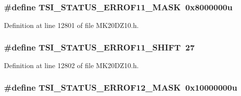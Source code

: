 \subsubsection[{\texorpdfstring{T\+S\+I\+\_\+\+S\+T\+A\+T\+U\+S\+\_\+\+E\+R\+R\+O\+F11\+\_\+\+M\+A\+SK}{TSI_STATUS_ERROF11_MASK}}]{\setlength{\rightskip}{0pt plus 5cm}\#define T\+S\+I\+\_\+\+S\+T\+A\+T\+U\+S\+\_\+\+E\+R\+R\+O\+F11\+\_\+\+M\+A\+SK~0x8000000u}\hypertarget{group___t_s_i___register___masks_ga572c3e8d870397a3164f394bfba2cb83}{}\label{group___t_s_i___register___masks_ga572c3e8d870397a3164f394bfba2cb83}


Definition at line 12801 of file M\+K20\+D\+Z10.\+h.

\subsubsection[{\texorpdfstring{T\+S\+I\+\_\+\+S\+T\+A\+T\+U\+S\+\_\+\+E\+R\+R\+O\+F11\+\_\+\+S\+H\+I\+FT}{TSI_STATUS_ERROF11_SHIFT}}]{\setlength{\rightskip}{0pt plus 5cm}\#define T\+S\+I\+\_\+\+S\+T\+A\+T\+U\+S\+\_\+\+E\+R\+R\+O\+F11\+\_\+\+S\+H\+I\+FT~27}\hypertarget{group___t_s_i___register___masks_gaec469b34d46570f2447a56b4231c1b44}{}\label{group___t_s_i___register___masks_gaec469b34d46570f2447a56b4231c1b44}


Definition at line 12802 of file M\+K20\+D\+Z10.\+h.

\subsubsection[{\texorpdfstring{T\+S\+I\+\_\+\+S\+T\+A\+T\+U\+S\+\_\+\+E\+R\+R\+O\+F12\+\_\+\+M\+A\+SK}{TSI_STATUS_ERROF12_MASK}}]{\setlength{\rightskip}{0pt plus 5cm}\#define T\+S\+I\+\_\+\+S\+T\+A\+T\+U\+S\+\_\+\+E\+R\+R\+O\+F12\+\_\+\+M\+A\+SK~0x10000000u}\hypertarget{group___t_s_i___register___masks_gadf94ad40f4a18616e13219e31f8c1a4d}{}\label{group___t_s_i___register___masks_gadf94ad40f4a18616e13219e31f8c1a4d}


